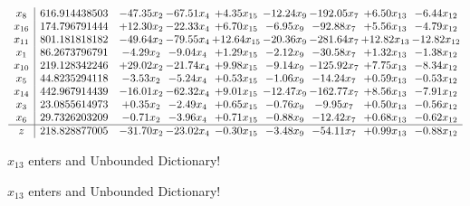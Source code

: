 \documentclass[9pt]{article}
\begin{document}
 \[\begin{array}{c| c c@{\hskip 2pt} c@{\hskip 2pt} c@{\hskip 2pt} c@{\hskip 2pt} c@{\hskip 2pt} c@{\hskip 2pt} c@{\hskip 2pt} }
 x_{8}   &  616.914438503 & -47.35 x_{2} & -67.51 x_{4} & +  4.35 x_{15} & -12.24 x_{9} & -192.05 x_{7} & +  6.50 x_{13} & -6.44 x_{12}\\
 x_{16}   &  174.796791444 & + 12.30 x_{2} & -22.33 x_{4} & +  6.70 x_{15} & -6.95 x_{9} & -92.88 x_{7} & +  5.56 x_{13} & -4.79 x_{12}\\
 x_{11}   &  801.181818182 & -49.64 x_{2} & -79.55 x_{4} & + 12.64 x_{15} & -20.36 x_{9} & -281.64 x_{7} & + 12.82 x_{13} & -12.82 x_{12}\\
 x_{1}   &  86.2673796791 & -4.29 x_{2} & -9.04 x_{4} & +  1.29 x_{15} & -2.12 x_{9} & -30.58 x_{7} & +  1.32 x_{13} & -1.38 x_{12}\\
 x_{10}   &  219.128342246 & + 29.02 x_{2} & -21.74 x_{4} & +  9.98 x_{15} & -9.14 x_{9} & -125.92 x_{7} & +  7.75 x_{13} & -8.34 x_{12}\\
 x_{5}   &  44.8235294118 & -3.53 x_{2} & -5.24 x_{4} & +  0.53 x_{15} & -1.06 x_{9} & -14.24 x_{7} & +  0.59 x_{13} & -0.53 x_{12}\\
 x_{14}   &  442.967914439 & -16.01 x_{2} & -62.32 x_{4} & +  9.01 x_{15} & -12.47 x_{9} & -162.77 x_{7} & +  8.56 x_{13} & -7.91 x_{12}\\
 x_{3}   &  23.0855614973 & +  0.35 x_{2} & -2.49 x_{4} & +  0.65 x_{15} & -0.76 x_{9} & -9.95 x_{7} & +  0.50 x_{13} & -0.56 x_{12}\\
 x_{6}   &  29.7326203209 & -0.71 x_{2} & -3.96 x_{4} & +  0.71 x_{15} & -0.88 x_{9} & -12.42 x_{7} & +  0.68 x_{13} & -0.62 x_{12}\\
\hline
z    &  218.828877005 & -31.70 x_{2} & -23.02 x_{4} & -0.30 x_{15} & -3.48 x_{9} & -54.11 x_{7} & +  0.99 x_{13} & -0.88 x_{12}\\
\end{array}\]


 $ x_{13} $ enters and Unbounded Dictionary!


 $ x_{13} $ enters and Unbounded Dictionary!
\end{document}
